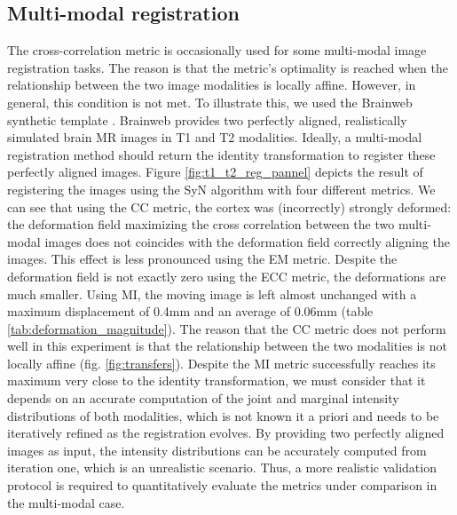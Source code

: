 

\subsection{Multi-modal registration}
The cross-correlation metric is occasionally used for some multi-modal image registration tasks. The reason is that the metric's optimality is reached when the relationship between the two image modalities is locally affine. However, in general, this condition is not met. To illustrate this, we used the Brainweb synthetic template \citep{Cocosco1997, Kwan1999}. Brainweb provides two perfectly aligned, realistically simulated brain MR images in T1 and T2 modalities. Ideally, a multi-modal registration method should return the identity transformation to register these perfectly aligned images. Figure \ref{fig:t1_t2_reg_pannel} depicts the result of registering the images using the SyN algorithm with four different metrics. We can see that using the CC metric, the cortex was (incorrectly) strongly deformed: the deformation field maximizing the cross correlation between the two multi-modal images does not coincides with the deformation field correctly aligning the images. This effect is less pronounced using the EM metric. Despite the deformation field is not exactly zero using the ECC metric, the deformations are much smaller. Using MI, the moving image is left almost unchanged with a maximum displacement of 0.4mm and an average of 0.06mm (table \ref{tab:deformation_magnitude}). The reason that the CC metric does not perform well in this experiment is that the relationship between the two modalities is not locally affine (fig. \ref{fig:transfers}). Despite the MI metric successfully reaches its maximum very close to the identity transformation, we must consider that it depends on an accurate computation of the joint and marginal intensity distributions of both modalities, which is not known {it a priori} and needs to be iteratively refined as the registration evolves. By providing two perfectly aligned images as input, the intensity distributions can be accurately computed from iteration one, which is an unrealistic scenario. Thus, a more realistic validation protocol is required to quantitatively evaluate the metrics under comparison in the multi-modal case.

